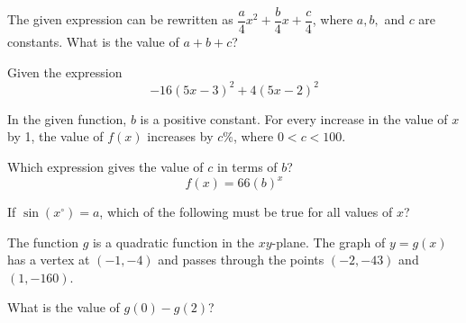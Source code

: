\noindent\markforreview
\vspace{1em}

The given expression can be rewritten as \(\dfrac{a}{4}x^2 + \dfrac{b}{4}x + \dfrac{c}{4}\), where \(a, b,\) and \(c\) are constants. What is the value of \(a + b + c\)?

Given the expression
\[
-16(5x - 3)^2 + 4(5x - 2)^2
\]

\vspace{0.75em}


\vspace{2em}
\newpage

\noindent\markforreview
\vspace{1em}

In the given function, \(b\) is a positive constant. For every increase in the value of \(x\) by 1, the value of \(f(x)\) increases by \(c\%\), where \(0 < c < 100\).

Which expression gives the value of \(c\) in terms of \(b\)?
\[
f(x) = 66(b)^x
\]

\vspace{0.75em}


\vspace{2em}
\newpage

\noindent\markforreview
\vspace{1em}

If \(\sin(x^\circ) = a\), which of the following must be true for all values of \(x\)?

\vspace{0.75em}


\vspace{2em}
\newpage

\noindent\markforreview
\vspace{1em}

The function \(g\) is a quadratic function in the \(xy\)-plane. The graph of \(y = g(x)\) has a vertex at \((-1, -4)\) and passes through the points \((-2, -43)\) and \((1, -160)\).

What is the value of \(g(0) - g(2)\)?

